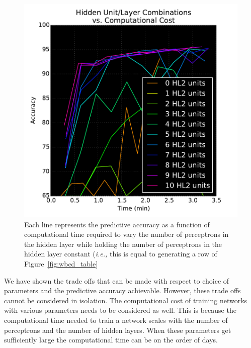 \begin{figure}[t]

\centering
\includegraphics[width=0.95\columnwidth]{figs/wbcd_timing}
\caption {Each line represents the predictive accuracy as a function of computational time required to vary the number of perceptrons in the  hidden layer while holding the number of perceptrons in the  hidden layer constant ({\em i.e.,} this is equal to generating a row of Figure~\ref{fig:wbcd_table}}
\label{fig:wbcd_timing}

\end{figure}

We have shown the trade offs that can be made with respect to choice of parameters and the predictive accuracy achievable.
However, these trade offs cannot be considered in isolation.
The computational cost of training networks with various parameters needs to be considered as well.
This is because the computational time needed to train a network scales with the number of perceptrons and the number of hidden layers.
When these parameters get sufficiently large the computational time can be on the order of days.

